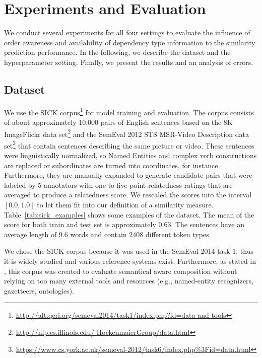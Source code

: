 \section{Experiments and Evaluation}
We conduct several experiments for all four settings to evaluate the influence of order awareness and availability of dependency type information to the similarity prediction performance. In the following, we describe the dataset and the hyperparameter setting. Finally, we present the results and an analysis of errors.

\subsection{Dataset}
We use the SICK corpus\footnote{\url{http://alt.qcri.org/semeval2014/task1/index.php?id=data-and-tools}} \autocite{marelli_sick_2014} for model training and evaluation. The corpus consists of about approximately 10.000 pairs of English sentences based on the 8K ImageFlickr data set\footnote{\url{http://nlp.cs.illinois.edu/
HockenmaierGroup/data.html}} \autocite{hodosh_framing_2013} and the SemEval 2012 STS MSR-Video Description data set\footnote{\url{https://www.cs.york.ac.uk/semeval-2012/task6/index.php\%3Fid=data.html}} \autocite{agirre_semeval-2012_2012} that contain sentences describing the same picture or video. These sentences were linguistically normalized, so Named Entities and complex verb constructions are replaced or subordinates are turned into coordinates, for instance. Furthermore, they are manually expanded to generate candidate pairs that were labeled by 5 annotators with one to five point relatedness ratings that are averaged to produce a relatedness score. We rescaled the scores into the interval $[0.0, 1.0]$ to let them fit into our definition of a similarity measure. Table~\ref{tab:sick_examples} shows some examples of the dataset. The mean of the score for both train and test set is approximately $0.63$. The sentences have an average length of $9.6$ words and contain $2408$ different token types.  

We chose the SICK corpus because it was used in the SemEval 2014 task 1, thus it is widely studied and various reference systems exist. Furthermore, as stated in \textcite{marelli_semeval-2014_2014}, this corpus was created to evaluate semantical aware composition without relying on too many external tools and resources (e.g., named-entity recognizers, gazetteers, ontologies).

